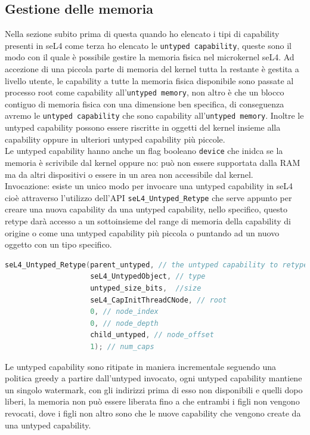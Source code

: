 \subsection{Gestione delle memoria}
Nella sezione subito prima di questa quando ho elencato i tipi di capability presenti in seL4 come terza ho elencato le \texttt{untyped capability}, queste sono il modo con il quale è possibile gestire la memoria fisica nel microkernel seL4. Ad accezione di una piccola parte di memoria del kernel tutta la restante è gestita a livello utente, le capability a tutte la memoria fisica disponibile sono passate al processo root come capability all'\texttt{untyped memory}, non altro è che un blocco contiguo di memoria fisica con una dimensione ben specifica, di conseguenza avremo le \texttt{untyped capability} che sono capability all'\texttt{untyped memory}. Inoltre le untyped capability possono essere riscritte in oggetti del kernel insieme alla capability oppure in ulteriori untyped capability più piccole.\\
Le untyped capability hanno anche un flag booleano \texttt{device} che inidca se la memoria è scrivibile dal kernel oppure no: può non essere supportata dalla RAM ma da altri dispositivi o essere in un area non accessibile dal kernel.\\
Invocazione: esiste un unico modo per invocare una untyped capability in seL4 cioè attraverso l'utilizzo dell'API \texttt{seL4\_Untyped\_Retype} che serve appunto per creare una nuova capability da una untyped capability, nello specifico, questo retype darà accesso a un sottoinsieme del range di memoria della capability di origine o come una untyped capability più piccola o puntando ad un nuovo oggetto con un tipo specifico.\\
\begin{lstlisting}[language=C++]
seL4_Untyped_Retype(parent_untyped, // the untyped capability to retype
                    seL4_UntypedObject, // type
                    untyped_size_bits,  //size
                    seL4_CapInitThreadCNode, // root
                    0, // node_index
                    0, // node_depth
                    child_untyped, // node_offset
                    1); // num_caps
\end{lstlisting}
Le untyped capability sono ritipate in maniera incrementale seguendo una politica greedy a partire dall'untyped invocato, ogni untyped capability mantiene un singolo watermark, con gli indirizzi prima di esso non disponibili e quelli dopo liberi, la memoria non può essere liberata fino a che entrambi i figli non vengono revocati, dove i figli non altro sono che le nuove capability che vengono create da una untyped capability.\\
